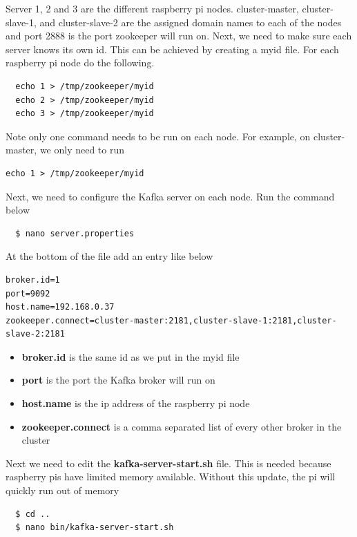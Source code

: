 Server 1, 2 and 3 are the different raspberry pi nodes. cluster-master, cluster-slave-1, and cluster-slave-2 are the assigned domain names to each of the nodes and port 2888 is the port zookeeper will run on. Next, we need to make sure each server knows its own id. This can be achieved by creating a myid file. For each raspberry pi node do the following. 

\begin{verbatim}
  echo 1 > /tmp/zookeeper/myid
  echo 2 > /tmp/zookeeper/myid
  echo 3 > /tmp/zookeeper/myid
\end{verbatim}

Note only one command needs to be run on each node. For example, on cluster-master, we only need to run 

\begin{verbatim}
echo 1 > /tmp/zookeeper/myid
\end{verbatim}

Next, we need to configure the Kafka server on each node. Run the command below

\begin{verbatim}
  $ nano server.properties
\end{verbatim}

At the bottom of the file add an entry like below

\begin{verbatim}
broker.id=1
port=9092
host.name=192.168.0.37
zookeeper.connect=cluster-master:2181,cluster-slave-1:2181,cluster-slave-2:2181
\end{verbatim}

\begin{itemize}
  \item \textbf{broker.id} is the same id as we put in the myid file
  \item \textbf{port} is the port the Kafka broker will run on
  \item \textbf{host.name} is the ip address of the raspberry pi node
  \item \textbf{zookeeper.connect} is a comma separated list of every other broker in the cluster
\end{itemize}

Next we need to edit the \textbf{kafka-server-start.sh} file. This is needed because raspberry pis have limited memory available. Without this update, the pi will quickly run out of memory \cite{raspberry:pi}

\begin{verbatim}
  $ cd ..
  $ nano bin/kafka-server-start.sh
\end{verbatim}

